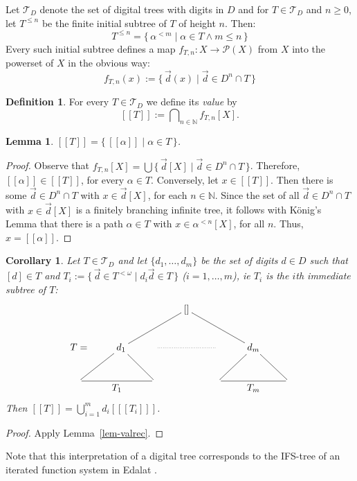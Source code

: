 \documentclass[microtype]{jloganal}
\theoremstyle{plain}
\newtheorem{lemma}[theorem]{Lemma}
\newtheorem{corollary}[theorem]{Corollary}
\theoremstyle{definition}
\newtheorem{definition}[theorem]{Definition}
\newcommand{\NN}{\mathbb{N}}
\newcommand{\PPP}{\mathcal{P}}
\newcommand{\TTT}{\mathcal{T}}
\newcommand{\val}[1]{[\![#1]\!]}
\newcommand{\set}[2]{\mbox{$\{\,#1 \mid #2 \,\}$}}
\newcommand{\fun}[3]{\mbox{$#1 \colon #2 \rightarrow #3$}}
\begin{document}
Let $\TTT_D$ denote the set of digital trees with digits in $D$ and for $T \in \TTT_D$ and $n \ge 0$, let $T^{\le n}$ be the finite initial subtree of $T$ of height $n$. Then: 
\[
T^{\le n} = \{\, \alpha^{<m} \mid \alpha \in T \wedge m \le n \,\}
\]
Every such initial subtree defines a map $\fun{f_{T,n}}{X}{\PPP(X)}$ from $X$ into the powerset of $X$ in the obvious way:
\[
f_{T,n}(x) := \set{\vec{d}(x)}{\vec{d} \in D^n \cap T}
\]

\begin{definition}
\label{def-val}
For every $T \in \TTT_D$ we define its \emph{value} by
\[
\val{T} := \bigcap\nolimits_{n\in\NN} f_{T,n}[X].
\]
\end{definition}

\begin{lemma}
\label{lem-semT}
$\val{T} =  \set{\val{\alpha}}{\alpha\in T}$.
\end{lemma}
\begin{proof}
Observe that $f_{T,n}[X] = \bigcup\set{\vec{d}[X]}{\vec{d} \in D^n \cap T}$. Therefore, $\val{\alpha} \in \val{T}$, for every $\alpha \in T$. 
Conversely, let $x \in \val{T}$. Then there is some $\vec{d} \in D^n\cap T$ with $x \in \vec{d}[X]$, for each $n \in \NN$. Since the set of all $\vec{d} \in D^n\cap T$ with $x \in \vec{d}[X]$ is a finitely branching infinite tree, it follows with K\"onig's Lemma that there is a path $\alpha \in T$ with $x \in \alpha^{<n}[X]$, for all $n$. Thus, $x = \val{\alpha}$.
\end{proof}

\begin{corollary}\label{cor-tree-valrec}
Let $T \in \TTT_D$ and let $\{d_1,\ldots,d_m\}$ be the set of digits $d\in D$
such that $[d]\in T$ and $T_i := \{\,\vec d\in T^{<\omega} \mid d_i\vec d\in T\,\}$ 
($i=1,\ldots,m$),
ie $T_i$ is the $i$th  immediate subtree of $T$:
\[
\xymatrix{
&&&&[]\ar@{-}[dll]\ar@{-}[drr]&&&& \\
&T=&d_1\ar@{-}[dl]\ar@{-}[dr]&\ar@{..}@*{[thicker]}[rr]&&&d_m\ar@{-}[dl]\ar@{-}[dr]&& \\
&\ar@{-}[rr]_{\text{\normalsize $T_1$}}&&&&&&\ar@{-}[ll]^{\text{\normalsize $T_m$}}&
}
\]
Then $\val{T} = \bigcup^m_{i=1} d_i[\val{T_i}]$.
\end{corollary}
\begin{proof}
Apply Lemma~\ref{lem-valrec}.
\end{proof}
Note that this interpretation of a digital tree corresponds to the IFS-tree
of an iterated function system in Edalat \cite{Edalat97}.
\end{document}
